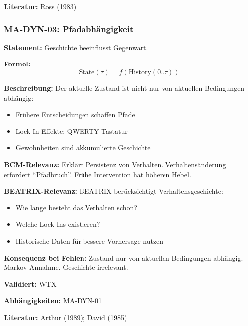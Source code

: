 \textbf{Literatur:} Ross (1983)


\subsubsection*{MA-DYN-03: Pfadabhängigkeit}

\textbf{Statement:} Geschichte beeinflusst Gegenwart.

\textbf{Formel:}
\begin{equation}
\text{State}(\tau) = f(\text{History}(0..\tau))
\end{equation}

\textbf{Beschreibung:}
Der aktuelle Zustand ist nicht nur von aktuellen Bedingungen abhängig:
\begin{itemize}
    \item Frühere Entscheidungen schaffen Pfade
    \item Lock-In-Effekte: QWERTY-Tastatur
    \item Gewohnheiten sind akkumulierte Geschichte
\end{itemize}

\textbf{BCM-Relevanz:}
Erklärt Persistenz von Verhalten. Verhaltensänderung erfordert ``Pfadbruch''. Frühe Intervention hat höheren Hebel.

\textbf{BEATRIX-Relevanz:}
BEATRIX berücksichtigt Verhaltensgeschichte:
\begin{itemize}
    \item Wie lange besteht das Verhalten schon?
    \item Welche Lock-Ins existieren?
    \item Historische Daten für bessere Vorhersage nutzen
\end{itemize}

\textbf{Konsequenz bei Fehlen:}
Zustand nur von aktuellen Bedingungen abhängig. Markov-Annahme. Geschichte irrelevant.

\textbf{Validiert:} WTX

\textbf{Abhängigkeiten:} MA-DYN-01

\textbf{Literatur:} Arthur (1989); David (1985)


